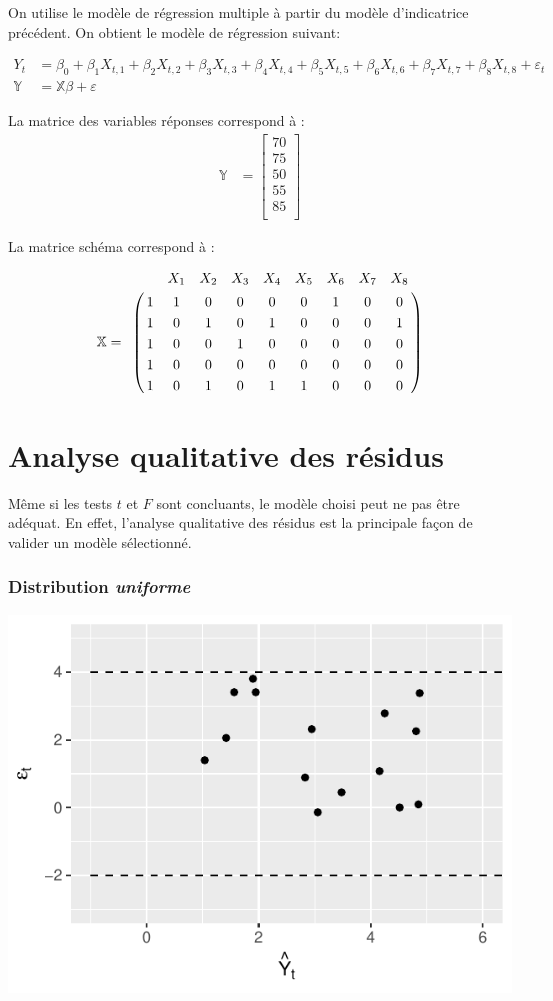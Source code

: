 \documentclass[11pt,french]{report}
\begin{document}
On utilise le modèle de régression multiple à partir du modèle d'indicatrice précédent. On obtient le modèle de régression suivant:

\begin{align*}
Y_t &= \beta_0 + \beta_1X_{t,1} + \beta_2X_{t,2} + \beta_3X_{t,3} 
+ \beta_4X_{t,4} + \beta_5X_{t,5} + \beta_6X_{t,6} + \beta_7X_{t,7} + \beta_8X_{t,8} + \varepsilon_t \\
\mathbb{Y} &= \mathbb{X}\mathbb{\beta} + \mathbb{\varepsilon}
\end{align*}

La matrice des variables réponses correspond à :
\begin{align*}
\mathbb{Y} &= 
\begin{bmatrix}
70 \\
75 \\
50 \\
55 \\
85 \\
\end{bmatrix}
\end{align*}

La matrice schéma correspond à :

\begin{align*}
\mathbb{X}
=
\bordermatrix { 
& &  X_1  & X_2 & X_3 & X_4 & X_5  & X_6 & X_7 & X_8 \cr 
& 1 & 1 & 0 & 0 & 0 & 0 & 1 & 0 & 0 \cr 
& 1 & 0 & 1 & 0 & 1 & 0 & 0 & 0 & 1 \cr 
& 1 & 0 & 0 & 1 & 0 & 0 & 0 & 0 & 0 \cr 
& 1 & 0 & 0 & 0 & 0 & 0 & 0 & 0 & 0 \cr 
& 1 & 0 & 1 & 0 & 1 & 1 & 0 & 0 & 0 \cr 
}
\end{align*}

\section{Analyse qualitative des résidus}
Même si les tests $t$ et $F$ sont concluants, le modèle choisi peut ne pas être adéquat. En effet, l'analyse qualitative des résidus est la principale façon de valider un modèle sélectionné. 

\subsubsection*{Distribution \emph{uniforme}}
\includegraphics{notes_de_cours-030}
\end{document}
